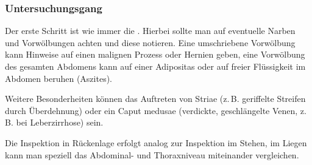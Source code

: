 \subsubsection{Untersuchungsgang}

{Der erste Schritt ist wie immer die
.
Hierbei sollte man auf eventuelle Narben
und Vorwölbungen achten und diese notieren. Eine umschriebene
Vorwölbung kann Hinweise auf einen malignen Prozess oder Hernien
geben, eine Vorwölbung des gesamten Abdomens kann auf einer
Adipositas oder auf freier Flüssigkeit im Abdomen beruhen (Aszites).

Weitere Besonderheiten können das Auftreten von Striae (z.\,B.
geriffelte Streifen durch Überdehnung) oder ein Caput medusae
(verdickte, geschlängelte Venen, z. B. bei Leberzirrhose) sein.}
{\MoveDown}
{}
{}
{}

{Die Inspektion in Rückenlage erfolgt analog zur Inspektion
im Stehen, im Liegen kann man speziell das Abdominal- und
Thoraxniveau miteinander vergleichen.
}
{\begin{PkuBefunde}[]
  \item[\SymbolPkuNormal] 
  \item[\SymbolPkuVariante] 
\end{PkuBefunde}}
{}
{}
{}


